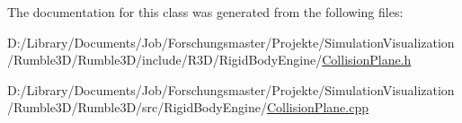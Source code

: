 The documentation for this class was generated from the following files\+:\begin{DoxyCompactItemize}
\item 
D\+:/\+Library/\+Documents/\+Job/\+Forschungsmaster/\+Projekte/\+Simulation\+Visualization/\+Rumble3\+D/\+Rumble3\+D/include/\+R3\+D/\+Rigid\+Body\+Engine/\mbox{\hyperlink{_collision_plane_8h}{Collision\+Plane.\+h}}\item 
D\+:/\+Library/\+Documents/\+Job/\+Forschungsmaster/\+Projekte/\+Simulation\+Visualization/\+Rumble3\+D/\+Rumble3\+D/src/\+Rigid\+Body\+Engine/\mbox{\hyperlink{_collision_plane_8cpp}{Collision\+Plane.\+cpp}}\end{DoxyCompactItemize}
